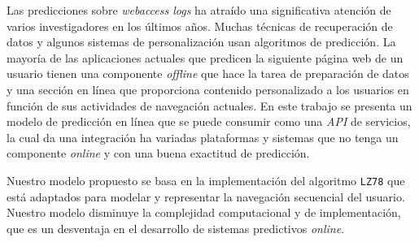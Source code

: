 {Las predicciones sobre \emph{webaccess logs} ha atraído una significativa atención de varios investigadores en los últimos años. Muchas técnicas de recuperación de datos y algunos sistemas de personalización usan algoritmos de predicción. La mayoría de las aplicaciones actuales que predicen la siguiente página web de un usuario tienen una componente  \emph{offline} que hace la tarea de preparación de datos y una sección en línea que proporciona contenido personalizado a los usuarios en función de sus actividades de navegación actuales. En este trabajo se presenta un modelo de predicción en línea que se puede consumir como una \emph{API} de servicios, la cual da una integración ha variadas plataformas y sistemas que no tenga un componente \emph{online} y con una buena exactitud de predicción. 

Nuestro modelo propuesto se basa en la implementación del algoritmo \texttt{LZ78} que está adaptados para modelar y representar la navegación secuencial del usuario. Nuestro modelo disminuye la complejidad computacional  y de implementación, que es un desventaja en el desarrollo de sistemas predictivos \emph{online}.
}

  
